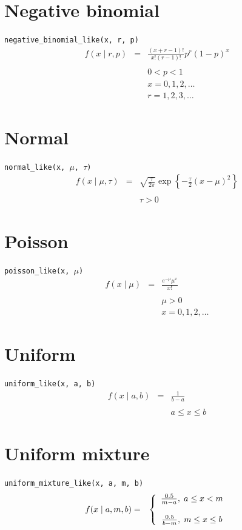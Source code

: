 \documentclass[]{book}
\begin{document}
\section*{Negative binomial}
\verb=negative_binomial_like(x, r, p)=
\begin{eqnarray*}
f(x \mid r, p) &=& \frac{(x+r-1)!}{x! (r-1)!} p^r (1-p)^x \\
\\
&&0 < p < 1 \\
&&x = 0,1,2,\ldots \\
&&r=1,2,3,\ldots
\end{eqnarray*}

\section*{Normal}
\verb=normal_like(x, =$\mu$\verb=, =$\tau$\verb=)=
\begin{eqnarray*}
f(x \mid \mu, \tau) &=& \sqrt{\frac{\tau}{2\pi}} \exp\left\{ -\frac{\tau}{2} (x-\mu)^2 \right\}\\
\\
&& \tau > 0
\end{eqnarray*}

\section*{Poisson}
\verb=poisson_like(x, =$\mu$\verb=)=
\begin{eqnarray*}
f(x \mid \mu) &=& \frac{e^{-\mu}\mu^x}{x!}\\
\\
&& \mu > 0\\
&& x = 0,1,2,\ldots
\end{eqnarray*}

\section*{Uniform}
\verb=uniform_like(x, a, b)=
\begin{eqnarray*}
f(x \mid a, b) &=& \frac{1}{b-a}\\
\\
&& a \le x \le b
\end{eqnarray*}

\section*{Uniform mixture}
\verb=uniform_mixture_like(x, a, m, b)=
\begin{eqnarray*}
f(x \mid a, m, b) &=& \left\{\begin{array}{c}\frac{0.5}{m-a}, \hspace{0.1cm} a \le x < m \\
\\
\frac{0.5}{b-m}, \hspace{0.1cm}m \le x \le b \end{array}\right.
\end{eqnarray*}
\end{document}
